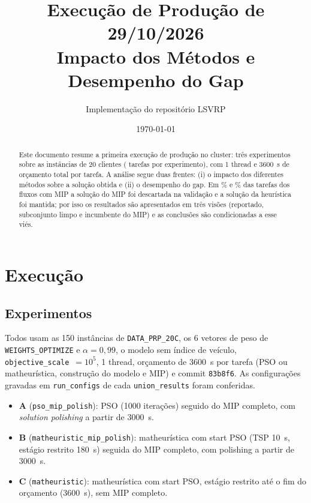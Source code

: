 \documentclass[11pt,a4paper]{article}
\title{Execução de Produção de 29/10/2026\\
       Impacto dos Métodos e Desempenho do Gap}
\author{Implementação do repositório LSVRP}
\date{\today}
\begin{document}
\maketitle

\begin{abstract}
\sloppy
Este documento resume a primeira execução de produção no cluster: três
experimentos sobre as instâncias de 20 clientes (\nTasks{} tarefas por experimento), com 1 thread e 3600~s de
orçamento total por tarefa. A análise segue duas frentes: (i) o impacto dos
diferentes métodos sobre a solução obtida e (ii) o desempenho do gap. Em
\pctAfallback\% e \pctBfallback\% das tarefas dos fluxos com MIP a solução do
MIP foi descartada na validação e a solução da heurística foi mantida; por isso
os resultados são apresentados em três visões (reportado, subconjunto limpo e
incumbente do MIP) e as conclusões são condicionadas a esse viés.
\end{abstract}

\section{Execução}

\subsection{Experimentos}

Todos usam as 150 instâncias de \texttt{DATA\_PRP\_20C}, os 6 vetores de peso de
\texttt{WEIGHTS\_OPTIMIZE} e $\alpha=0{,}99$, o modelo sem índice de veículo,
\texttt{objective\_scale}~$=10^{5}$, 1 thread, orçamento de 3600~s por tarefa (PSO ou
matheurística, construção do modelo e MIP) e commit \texttt{83b8f6}. As
configurações gravadas em \texttt{run\_configs} de cada \texttt{union\_results}
foram conferidas.

\begin{itemize}[leftmargin=*]
  \item \textbf{A} (\texttt{pso\_mip\_polish}): PSO (1000 iterações) seguido do MIP completo,
  com \emph{solution polishing} a partir de 3000~s.
  \item \textbf{B} (\texttt{matheuristic\_mip\_polish}): matheurística com start PSO
  (TSP 10~s, estágio restrito 180~s) seguida do MIP completo, com polishing a partir
  de 3000~s.
  \item \textbf{C} (\texttt{matheuristic}): matheurística com start PSO, estágio
  restrito até o fim do orçamento (3600~s), sem MIP completo.
\end{itemize}
\end{document}
